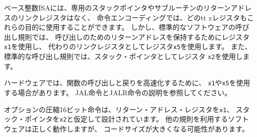 \begin{comment}
\begin{commentary}
There is no dedicated stack pointer or subroutine return address link
register in the Base Integer ISA; the instruction encoding allows any
{\tt x} register to be used for these purposes. However, the standard
software calling convention uses register {\tt x1} to hold the return
address for a call, with register {\tt x5} available as an alternate
link register.
The standard calling convention uses register {\tt x2} as the stack
pointer.

Hardware might choose to accelerate function calls and returns that
use {\tt x1} or {\tt x5}. See the descriptions of the JAL and JALR
instructions.

The optional compressed 16-bit instruction format is designed around
the assumption that {\tt x1} is the return address register and {\tt
 x2} is the stack pointer. Software using other conventions will
operate correctly but may have greater code size.
\end{commentary}
\end{comment}

\begin{commentary}
ベース整数ISAには、専用のスタックポインタやサブルーチンのリターンアドレスのリンクレジスタはなく、
命令エンコーディングでは、どの{tt x}レジスタもこれらの目的に使用することができます。
しかし、標準的なソフトウェアの呼び出し規則では、
呼び出しのためのリターンアドレスを保持するためにレジスタ{\tt x1}を使用し、
代わりのリンクレジスタとしてレジスタ{\tt x5}を使用します。
また、標準的な呼び出し規則では、スタック・ポインタとしてレジスタ {\tt x2}を使用します。

ハードウェアでは、関数の呼び出しと戻りを高速化するために、
{\tt x1}や{\tt x5}を使用する場合があります。
JAL命令とJALR命令の説明を参照してください。

オプションの圧縮16ビット命令は、リターン・アドレス・レジスタを{\tt x1}、
スタック・ポインタを{\tt x2}と仮定して設計されています。
他の規則を利用するソフトウェアは正しく動作しますが、
コードサイズが大きくなる可能性があります。
\end{commentary}


